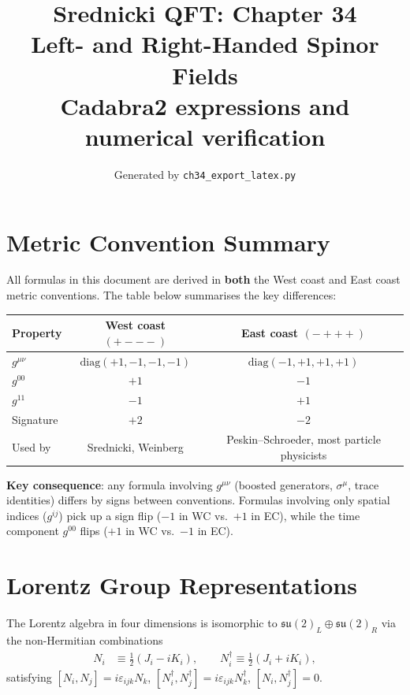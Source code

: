 \documentclass[12pt]{article}
\title{\textbf{Srednicki QFT: Chapter 34}\\[6pt]
       \large Left- and Right-Handed Spinor Fields\\[4pt]
       \normalsize Cadabra2 expressions and numerical verification}
\author{Generated by \texttt{ch34\_export\_latex.py}}
\date{}
\begin{document}
\maketitle

\section*{Metric Convention Summary}

All formulas in this document are derived in \textbf{both} the West coast and East coast
metric conventions. The table below summarises the key differences:

\medskip
\begin{center}
\renewcommand{\arraystretch}{1.4}
\begin{tabular}{@{}lcc@{}}
  \toprule
  Property & West coast $(+{-}{-}{-})$ & East coast $(-{+}{+}{+})$ \\
  \midrule
  $g^{\mu\nu}$ & $\mathrm{diag}(+1,-1,-1,-1)$ & $\mathrm{diag}(-1,+1,+1,+1)$ \\
  $g^{00}$ & $+1$ & $-1$ \\
  $g^{11}$ & $-1$ & $+1$ \\
  Signature & $+2$ & $-2$ \\
  Used by & Srednicki, Weinberg & Peskin--Schroeder, most particle physicists \\
  \bottomrule
\end{tabular}
\end{center}
\medskip

\noindent\textbf{Key consequence}: any formula involving $g^{\mu\nu}$ (boosted generators,
$\sigma^\mu$, trace identities) differs by signs between conventions.
Formulas involving only spatial indices ($g^{ij}$) pick up a sign flip
($-1$ in WC vs.\ $+1$ in EC), while the time component $g^{00}$ flips
($+1$ in WC vs.\ $-1$ in EC).

\tableofcontents
\newpage

\section{Lorentz Group Representations}

The Lorentz algebra in four dimensions is isomorphic to
$\mathfrak{su}(2)_L \oplus \mathfrak{su}(2)_R$ via the
non-Hermitian combinations
\begin{align}
  N_i &\equiv \tfrac{1}{2}(J_i - iK_i), \qquad
  N_i^\dagger \equiv \tfrac{1}{2}(J_i + iK_i),
\end{align}
satisfying $[N_i, N_j] = i\varepsilon_{ijk}N_k$,
$[N_i^\dagger, N_j^\dagger] = i\varepsilon_{ijk}N_k^\dagger$,
$[N_i, N_j^\dagger] = 0$.
\end{document}
